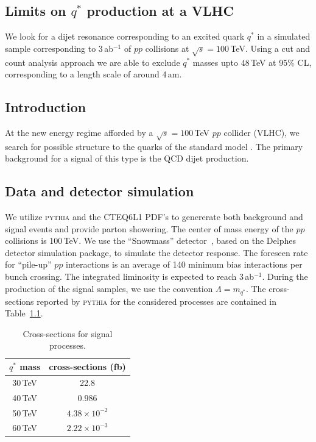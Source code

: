\begin{boldmath}
\chapter{Limits on $q^*$ production at a VLHC}
\label{chap:VLHC_Qstar}
\end{boldmath}



We look for a dijet resonance corresponding to an excited quark $q^*$
in a simulated sample corresponding to 3\,ab$^{-1}$ of $pp$ collisions
at $\sqrt{s} = 100$\,TeV.  Using a cut and count analysis approach we
are able to exclude $q^*$ masses upto 48\,TeV at 95\% CL,
corresponding to a length scale of around 4\,am.

\section{Introduction}

At the new energy regime afforded by a $\sqrt{s} =100$\,TeV $pp$
collider (VLHC), we search for possible structure to the quarks of the
standard model \cite{Baur:1989kv, Baur:1987ga, Harris:1996ct}.  The primary background for a
signal of this type is the QCD dijet production.

\section{Data and detector simulation}

We utilize \textsc{pythia} and the CTEQ6L1 PDF's to genererate both
background and signal events and provide parton showering.  The center
of mass energy of the $pp$ collisions is 100\,TeV.  We use the
``Snowmass'' detector~\cite{SnowDet}, based on the
Delphes~\cite{Delphes} detector simulation package, to simulate the
detector response.  The foreseen rate for ``pile-up'' $pp$
interactions is an average of 140 minimum bias interactions per bunch
crossing.  The integrated liminosity is expected to reach
3\,ab$^{-1}$.  During the production of the signal samples, we use the
convention $\Lambda = m_{q^*}$.  The cross-sections reported by
\textsc{pythia} for the considered processes are contained in
Table~\ref{tab:qstar_xsec}.

\begin{table}
\caption{\label{tab:qstar_xsec} Cross-sections for signal processes.}
\begin{center}
\begin{tabular}{|c|c|}
\hline
$q^*$ mass & cross-sections (fb) \\
\hline
30\,TeV & 22.8 \\
40\,TeV & 0.986 \\
50\,TeV & $4.38\times 10^{-2}$ \\
60\,TeV & $2.22\times 10^{-3}$ \\
\hline
\end{tabular}
\end{center}
\end{table}

